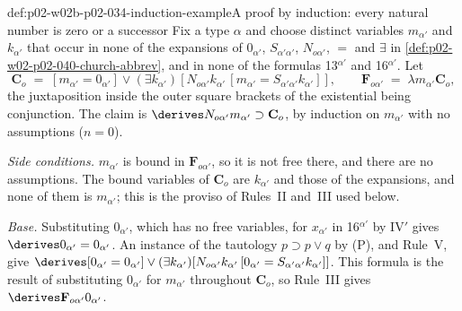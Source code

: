 \begin{hbexample}{def:p02-w02b-p02-034-induction-example}{A proof by induction: every natural number is zero or a successor}
Fix a type \(\alpha\) and choose distinct variables \(m_{\alpha'}\) and
\(k_{\alpha'}\) that occur in none of the expansions of \(0_{\alpha'}\),
\(S_{\alpha'\alpha'}\), \(N_{o\alpha'}\), \(=\) and \(\exists\) in
\cref{def:p02-w02-p02-040-church-abbrev}, and in none of the formulas
13\(^{\alpha'}\) and 16\(^{\alpha'}\).  Let
\[
 \mathbf C_o\;=\;[m_{\alpha'}=0_{\alpha'}]\vee(\exists k_{\alpha'})[N_{o\alpha'}k_{\alpha'}\,[m_{\alpha'}=S_{\alpha'\alpha'}k_{\alpha'}]],
 \qquad
 \mathbf F_{o\alpha'}\;=\;\lambda m_{\alpha'}\mathbf C_o,
\]
the juxtaposition inside the outer square brackets of the existential being
conjunction.  The claim is \(\derives N_{o\alpha'}m_{\alpha'}\supset\mathbf C_o\),
by induction on \(m_{\alpha'}\) with no assumptions (\(n=0\)).

\emph{Side conditions.}  \(m_{\alpha'}\) is bound in \(\mathbf F_{o\alpha'}\),
so it is not free there, and there are no assumptions.  The bound variables
of \(\mathbf C_o\) are \(k_{\alpha'}\) and those of the expansions, and none
of them is \(m_{\alpha'}\); this is the proviso of Rules~II and~III used
below.

\emph{Base.}  Substituting \(0_{\alpha'}\), which has no free variables, for
\(x_{\alpha'}\) in 16\(^{\alpha'}\) by IV\('\) gives
\(\derives0_{\alpha'}=0_{\alpha'}\).  An instance of the tautology
\(p\supset p\vee q\) by (P), and Rule~V, give
\(\derives[0_{\alpha'}=0_{\alpha'}]\vee(\exists k_{\alpha'})[N_{o\alpha'}k_{\alpha'}\,[0_{\alpha'}=S_{\alpha'\alpha'}k_{\alpha'}]]\).
This formula is the result of substituting \(0_{\alpha'}\) for
\(m_{\alpha'}\) throughout \(\mathbf C_o\), so Rule~III gives
\(\derives\mathbf F_{o\alpha'}0_{\alpha'}\).


\end{hbexample}
